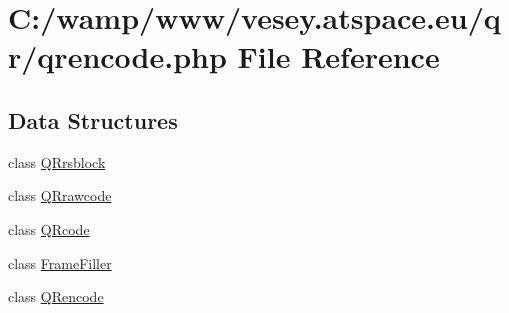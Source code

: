\hypertarget{qrencode_8php}{\section{C\-:/wamp/www/vesey.atspace.\-eu/qr/qrencode.php File Reference}
\label{qrencode_8php}
}
\subsection*{Data Structures}
\begin{DoxyCompactItemize}
\item 
class \hyperlink{class_q_rrsblock}{Q\-Rrsblock}
\item 
class \hyperlink{class_q_rrawcode}{Q\-Rrawcode}
\item 
class \hyperlink{class_q_rcode}{Q\-Rcode}
\item 
class \hyperlink{class_frame_filler}{Frame\-Filler}
\item 
class \hyperlink{class_q_rencode}{Q\-Rencode}
\end{DoxyCompactItemize}
